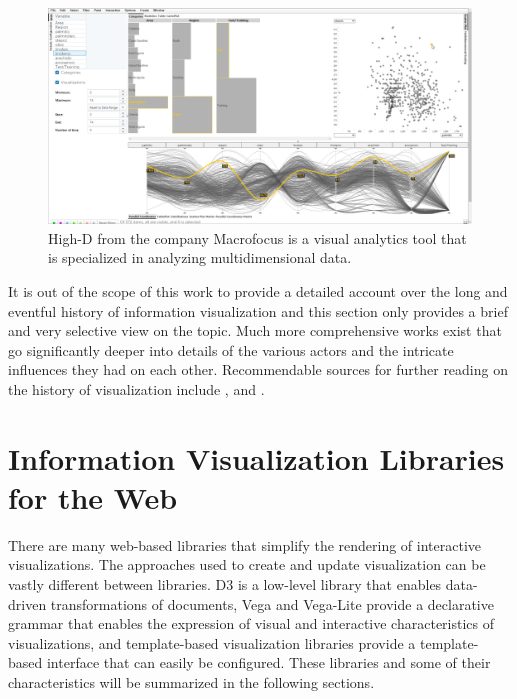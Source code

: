 \begin{figure}[tp]
    \centering
    \includegraphics[keepaspectratio,width=\linewidth,height=\fullh / 3]
    {images/high-d.png}
    \caption[Screenshot of High-D]{
        High-D from the company Macrofocus is a visual analytics tool that is specialized in analyzing multidimensional data. 
         
    }
    \label{fig:HighD}
\end{figure}

It is out of the scope of this work to provide a detailed account over the long and eventful history of information visualization and this section only provides a brief and very selective view on the topic. Much more comprehensive works exist that go significantly deeper into details of the various actors and the intricate influences they had on each other. Recommendable sources for further reading on the history of visualization include \cite{BriefHistoryOfDataVis}, \cite{HistoryOfDataVisAndGraphicCommunication} and \cite{HistoryOfInformationGraphics}.

\section{Information Visualization Libraries for the Web}

There are many web-based libraries that simplify the rendering of interactive visualizations. The approaches used to create and update visualization can be vastly different between libraries. D3 is a low-level library that enables data-driven transformations of documents, Vega and Vega-Lite provide a declarative grammar that enables the expression of visual and interactive characteristics of visualizations, and template-based visualization libraries provide a template-based interface that can easily be configured. These libraries and some of their characteristics will be summarized in the following sections.

